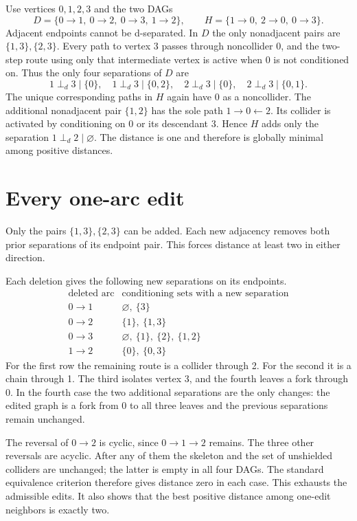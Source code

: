 \documentclass[11pt,a4paper]{amsart}
\begin{document}
Use vertices \(0,1,2,3\) and the two DAGs
\[
 D=\{0\to1,\ 0\to2,\ 0\to3,\ 1\to2\},\qquad
 H=\{1\to0,\ 2\to0,\ 0\to3\}.
\]
Adjacent endpoints cannot be d-separated. In \(D\) the only
nonadjacent pairs are \(\{1,3\},\{2,3\}\). Every path to
vertex 3 passes through noncollider 0, and the two-step route
using only that intermediate vertex is active when 0 is not
conditioned on. Thus the only four separations of \(D\) are
\[
 1\perp_d3\mid\{0\},\quad1\perp_d3\mid\{0,2\},\quad
 2\perp_d3\mid\{0\},\quad2\perp_d3\mid\{0,1\}.
\]
The unique corresponding paths in \(H\) again have 0 as a
noncollider. The additional nonadjacent pair \(\{1,2\}\)
has the sole path \(1\to0\leftarrow2\). Its collider is activated
by conditioning on 0 or its descendant 3. Hence \(H\) adds only
the separation \(1\perp_d2\mid\varnothing\). The distance is one
and therefore is globally minimal among positive distances.

\section{Every one-arc edit}

Only the pairs \(\{1,3\},\{2,3\}\) can be added. Each
new adjacency removes both prior separations of its endpoint
pair. This forces distance at least two in either direction.

Each deletion gives the following new separations on its endpoints.
\[
\begin{array}{c|l}
\text{deleted arc}&\text{conditioning sets with a new separation}\\
0\to1&\varnothing,\ \{3\}\\
0\to2&\{1\},\ \{1,3\}\\
0\to3&\varnothing,\ \{1\},\ \{2\},\ \{1,2\}\\
1\to2&\{0\},\ \{0,3\}
\end{array}
\]
For the first row the remaining route is a collider through 2.
For the second it is a chain through 1. The third isolates
vertex 3, and the fourth leaves a fork through 0. In the
fourth case the two additional separations are the only changes:
the edited graph is a fork from 0 to all three leaves and
the previous separations remain unchanged.

The reversal of \(0\to2\) is cyclic, since \(0\to1\to2\)
remains. The three other reversals are acyclic. After any of
them the skeleton and the set of unshielded colliders are
unchanged; the latter is empty in all four DAGs. The standard
equivalence criterion \cite{vp,chick95} therefore gives distance
zero in each case. This exhausts the admissible edits. It also
shows that the best positive distance among one-edit neighbors
is exactly two.
\end{document}
